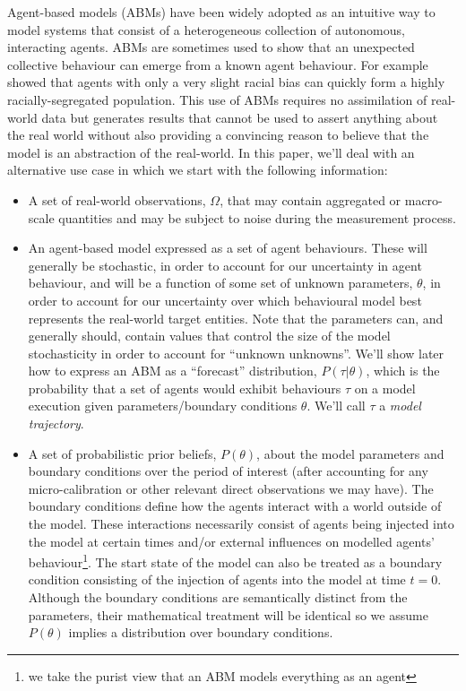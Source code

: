 \documentclass{article}
\begin{document}
Agent-based models (ABMs) have been widely adopted as an intuitive way to model systems that consist of a heterogeneous collection of autonomous, interacting agents. ABMs are sometimes used to show that an unexpected collective behaviour can emerge from a known agent behaviour.  For example \citet{schelling1971dynamic} showed that agents with only a very slight racial bias can quickly form a highly racially-segregated population. This use of ABMs requires no assimilation of real-world data but generates results that cannot be used to assert anything about the real world without also providing a convincing reason to believe that the model is an abstraction of the real-world. In this paper, we'll deal with an alternative use case in which we start with the following information:
\begin{itemize}
\item A set of real-world observations, $\Omega$, that may contain aggregated or macro-scale quantities and may be subject to noise during the measurement process.

\item An agent-based model expressed as a set of agent behaviours. These will generally be stochastic, in order to account for our uncertainty in agent behaviour, and will be a function of some set of unknown parameters, $\theta$, in order to account for our uncertainty over which behavioural model best represents the real-world target entities. Note that the parameters can, and generally should, contain values that control the size of the model stochasticity in order to account for ``unknown unknowns''. We'll show later how to express an ABM as a ``forecast'' distribution, $P(\tau| \theta)$, which is the probability that a set of agents would exhibit behaviours $\tau$ on a model execution given parameters/boundary conditions $\theta$. We'll call $\tau$ a \textit{model trajectory}.

\item A set of probabilistic prior beliefs, $P(\theta)$, about the model parameters and boundary conditions over the period of interest (after accounting for any micro-calibration or other relevant direct observations we may have). The boundary conditions define how the agents interact with a world outside of the model. These interactions necessarily consist of agents being injected into the model at certain times and/or external influences on modelled agents' behaviour\footnote{we take the purist view that an ABM models everything as an agent}. The start state of the model can also be treated as a boundary condition consisting of the injection of agents into the model at time $t=0$. Although the boundary conditions are semantically distinct from the parameters, their mathematical treatment will be identical so we assume $P(\theta)$ implies a distribution over boundary conditions.
\end{itemize}
\end{document}
